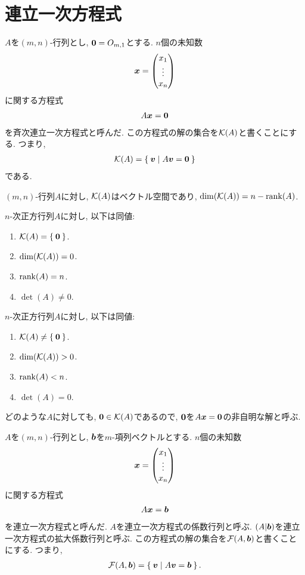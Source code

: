 \section{連立一次方程式}
$A$を$(m,n)$-行列とし, $\boldsymbol{0}=O_{m,1}$とする.
$n$個の未知数
\begin{align*}
  \boldsymbol{x}=\begin{pmatrix}x_1\\\vdots\\x_n\end{pmatrix}
\end{align*}
に関する方程式
\begin{align*}
  A\boldsymbol{x}=\boldsymbol{0}
\end{align*}
を斉次連立一次方程式と呼んだ.
この方程式の解の集合を$\mathcal{K}(A)$と書くことにする.
つまり,
\begin{align*}
  \mathcal{K}(A)=\Set{\boldsymbol{v}|A\boldsymbol{v}=\boldsymbol{0}}
\end{align*}
である.
\begin{prop}
  $(m,n)$-行列$A$に対し,
  $\mathcal{K}(A)$はベクトル空間であり,
  $\dim(\mathcal{K}(A))=n-\operatorname{rank}(A)$.
\end{prop}
\begin{cor}
  $n$-次正方行列$A$に対し,
  以下は同値:
  \begin{enumerate}
  \item $\mathcal{K}(A)=\Set{\boldsymbol{0}}$.
  \item $\dim(\mathcal{K}(A))=0$.
  \item $\operatorname{rank}(A)= n$.
  \item $\det(A)\neq 0$.
  \end{enumerate}
\end{cor}

\begin{cor}
  $n$-次正方行列$A$に対し,
  以下は同値:
  \begin{enumerate}
  \item $\mathcal{K}(A)\neq \Set{\boldsymbol{0}}$.
  \item $\dim(\mathcal{K}(A))>0$.
  \item $\operatorname{rank}(A)< n$.
  \item $\det(A)= 0$.
  \end{enumerate}
\end{cor}

\begin{remark}
  どのような$A$に対しても,
  $\boldsymbol{0}\in\mathcal{K}(A)$であるので,
  $\boldsymbol{0}$を$A\boldsymbol{x}=\boldsymbol{0}$の非自明な解と呼ぶ.
\end{remark}


$A$を$(m,n)$-行列とし, $\boldsymbol{b}$を$m$-項列ベクトルとする.
$n$個の未知数
\begin{align*}
  \boldsymbol{x}=\begin{pmatrix}x_1\\\vdots\\x_n\end{pmatrix}
\end{align*}
に関する方程式
\begin{align*}
  A\boldsymbol{x}=\boldsymbol{b}
\end{align*}
を連立一次方程式と呼んだ.
$A$を連立一次方程式の係数行列と呼ぶ.
$(A|\boldsymbol{b})$を連立一次方程式の拡大係数行列と呼ぶ.
この方程式の解の集合を$\mathcal{F}(A,\boldsymbol{b})$と書くことにする.
つまり,
\begin{align*}
  \mathcal{F}(A,\boldsymbol{b})=\Set{\boldsymbol{v}|A\boldsymbol{v}=\boldsymbol{b}}.
\end{align*}

